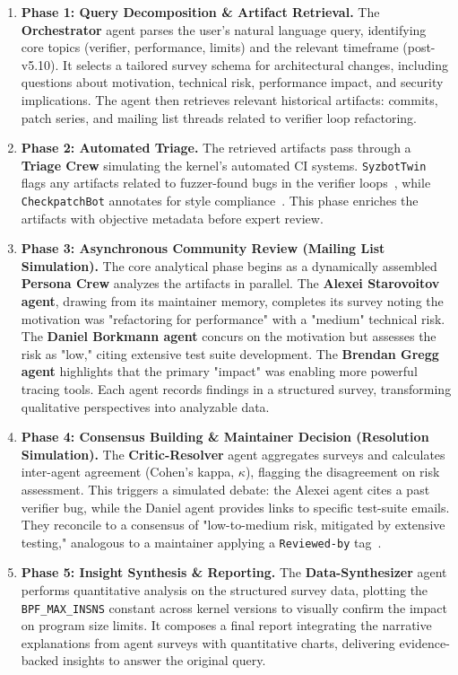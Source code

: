 \begin{enumerate}
\item \textbf{Phase 1: Query Decomposition \& Artifact Retrieval.} The \textbf{Orchestrator} agent parses the user's natural language query, identifying core topics (verifier, performance, limits) and the relevant timeframe (post-v5.10). It selects a tailored survey schema for architectural changes, including questions about motivation, technical risk, performance impact, and security implications. The agent then retrieves relevant historical artifacts: commits, patch series, and mailing list threads related to verifier loop refactoring.

\item \textbf{Phase 2: Automated Triage.} The retrieved artifacts pass through a \textbf{Triage Crew} simulating the kernel's automated CI systems. \texttt{SyzbotTwin} flags any artifacts related to fuzzer-found bugs in the verifier loops~\cite{vyukov2020syzkaller}, while \texttt{CheckpatchBot} annotates for style compliance~\cite{kerneldocs-checkpatch}. This phase enriches the artifacts with objective metadata before expert review.

\item \textbf{Phase 3: Asynchronous Community Review (Mailing List Simulation).} The core analytical phase begins as a dynamically assembled \textbf{Persona Crew} analyzes the artifacts in parallel. The \textbf{Alexei Starovoitov agent}, drawing from its maintainer memory, completes its survey noting the motivation was "refactoring for performance" with a "medium" technical risk. The \textbf{Daniel Borkmann agent} concurs on the motivation but assesses the risk as "low," citing extensive test suite development. The \textbf{Brendan Gregg agent} highlights that the primary "impact" was enabling more powerful tracing tools. Each agent records findings in a structured survey, transforming qualitative perspectives into analyzable data.

\item \textbf{Phase 4: Consensus Building \& Maintainer Decision (Resolution Simulation).} The \textbf{Critic-Resolver} agent aggregates surveys and calculates inter-agent agreement (Cohen's kappa, $\kappa$), flagging the disagreement on risk assessment. This triggers a simulated debate: the Alexei agent cites a past verifier bug, while the Daniel agent provides links to specific test-suite emails. They reconcile to a consensus of "low-to-medium risk, mitigated by extensive testing," analogous to a maintainer applying a \texttt{Reviewed-by} tag~\cite{kerneldocs-submitting}.

\item \textbf{Phase 5: Insight Synthesis \& Reporting.} The \textbf{Data-Synthesizer} agent performs quantitative analysis on the structured survey data, plotting the \texttt{BPF\_MAX\_INSNS} constant across kernel versions to visually confirm the impact on program size limits. It composes a final report integrating the narrative explanations from agent surveys with quantitative charts, delivering evidence-backed insights to answer the original query.
\end{enumerate}


